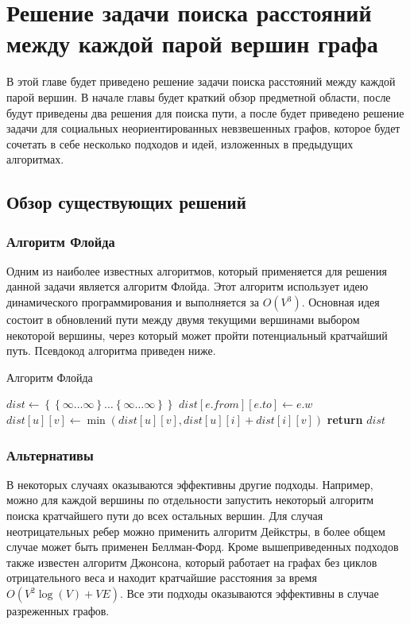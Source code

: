 \chapter{Решение задачи поиска расстояний между каждой парой вершин графа}

В этой главе будет приведено решение задачи поиска расстояний между каждой парой вершин. В начале главы будет краткий обзор предметной области, после будут приведены два решения для поиска пути, а после будет приведено решение задачи для социальных неориентированных невзвешенных графов, которое будет сочетать в себе несколько подходов и идей, изложенных в предыдущих алгоритмах. 

\FloatBarrier
\section{Обзор существующих решений}

\subsection{Алгоритм Флойда}
Одним из наиболее известных алгоритмов, который применяется для решения данной задачи является алгоритм Флойда. Этот алгоритм использует идею динамического программирования и выполняется за $O(V^3)$. Основная идея состоит в обновлений пути между двумя текущими вершинами выбором некоторой вершины, через который может пройти потенциальный кратчайший путь. Псевдокод алгоритма приведен ниже. 

\FloatBarrier
\begin{algorithm}
\caption{Алгоритм Флойда}\label{floyd}
\begin{algorithmic}[1]
\State $dist\gets \left\{ {   \left\{ {\infty \ldots \infty}\right\}  \ldots \left\{ {\infty \ldots \infty}\right\} }\right\}$
	\State $dist[e.from][e.to] \gets e.w$
\EndFor 
\State
{}
			\State $dist[u][v] \gets \min(dist[u][v], dist[u][i] + dist[i][v])$
		\EndFor
	\EndFor
\EndFor
\State \textbf{return} $dist$
\EndProcedure
\end{algorithmic}
\end{algorithm}

\FloatBarrier
\subsection{Альтернативы}
В некоторых случаях оказываются эффективны другие подходы. Например, можно для каждой вершины по отдельности запустить некоторый алгоритм поиска кратчайшего пути до всех остальных вершин. Для случая неотрицательных ребер можно применить алгоритм Дейкстры, в более общем случае может быть применен Беллман-Форд. Кроме вышеприведенных подходов также известен алгоритм Джонсона, который работает на графах без циклов отрицательного веса и находит кратчайшие расстояния за время $O(V^2 \log(V) + VE)$. Все эти подходы оказываются эффективны в случае разреженных графов.

